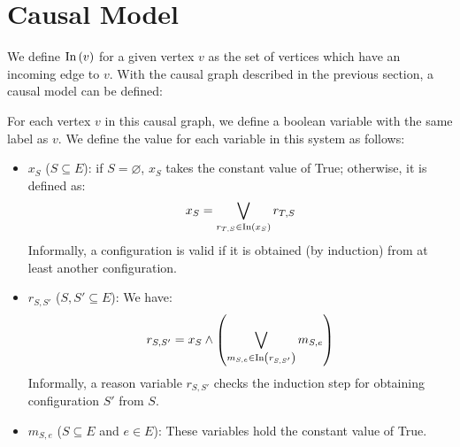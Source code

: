 \section{Causal Model}

We define $\text{In} \left( v \right)$ for a given vertex $v$ as the set of vertices
which have an incoming edge to $v$. With the causal graph described
in the previous section, a causal model can be defined:

For each vertex $v$ in this causal graph, we define a
boolean variable with the same label as $v$.
We define the value for each variable in this system as follows:

\begin{itemize}
  \item $x_{S}$ ($S \subseteq E$): if $S = \varnothing$, $x_S$
  takes the constant value of True; otherwise, it is defined as:
  \[ x_S = \bigvee_{r_{T,S} \in \text{In} \left( x_S \right)} r_{T,S} \]
  Informally, a configuration is valid if it is obtained (by induction)
  from at least another configuration. 
  \item $r_{S,S'}$ ($S,S' \subseteq E$): We have:
  \[ r_{S,S'} = x_S \wedge
    \left( \bigvee_{m_{S,e} \in \text{In} \left( r_{S,S'} \right)} m_{S,e} \right) \]
  Informally, a reason variable $r_{S,S'}$ checks the induction step for
  obtaining configuration $S'$ from $S$.
  \item $m_{S,e}$ ($S \subseteq E$ and $e \in E$): These variables hold
  the constant value of True.  
\end{itemize}
